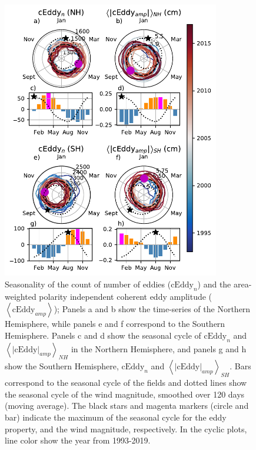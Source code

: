 \documentclass[draft,linenumbers]{agujournal2019}
\newcommand{\cEddy}{\textrm{cEddy}}
\begin{document}
	\begin{figure}
	    \centering
	    \includegraphics[width=95mm]{./figures/All_polar_plots_eddy_stats_polarity_V3.pdf}
	    \caption{
		Seasonality of the count of number of eddies ($\cEddy
		_n$) and the area-weighted polarity independent coherent eddy amplitude ($\left<\cEddy_{amp}\right>$); Panels a and b show the time-series of the Northern Hemisphere, while panels e and f correspond to the Southern Hemisphere. Panels c and d show the seasonal cycle of $\cEddy_n$ and $\left<|\cEddy|_{amp}\right>_{NH}$ in the Northern Hemisphere, and panels g and h show the Southern Hemisphere, $\cEddy_n$ and $\left<|\cEddy|_{amp}\right>_{SH}$.
		Bars correspond to the seasonal cycle of the fields and dotted lines show the seasonal cycle of the wind magnitude, smoothed over 120 days (moving average). 
		The black stars and magenta markers (circle and bar) indicate the maximum of the seasonal cycle for the eddy property, and the wind magnitude, respectively. In the cyclic plots, line color show the year from 1993-2019.}
	    \label{fig:eddy_stats}
	\end{figure}
\end{document}
